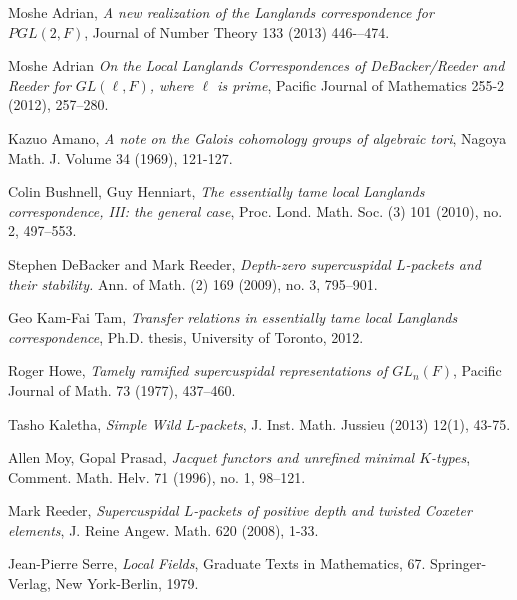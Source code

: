 \documentclass[11pt]{amsart}
\theoremstyle{plain}
\theoremstyle{definition}
\begin{document}
\begin{thebibliography}{9}

  Moshe Adrian,
  \emph{A new realization of the Langlands correspondence for $PGL(2,F)$}, Journal of Number Theory 133 (2013) 446-–474.

  Moshe Adrian
  \emph{On the Local Langlands Correspondences of DeBacker/Reeder and Reeder for $GL(\ell,F)$, where $\ell$ is prime}, Pacific Journal of Mathematics 255-2 (2012), 257--280.

  Kazuo Amano,
  \emph{A note on the Galois cohomology groups of algebraic tori}, Nagoya Math. J. Volume 34 (1969), 121-127.

  Colin Bushnell, Guy Henniart,
  \emph{The essentially tame local Langlands correspondence, III: the general case}, Proc. Lond. Math. Soc. (3) 101 (2010), no. 2, 497–553.

  Stephen DeBacker and Mark Reeder,
  \emph{Depth-zero supercuspidal $L$-packets and their stability.}
  Ann. of Math. (2) 169 (2009), no. 3, 795--901.

  Geo Kam-Fai Tam,
  \emph{Transfer relations in essentially tame local Langlands correspondence}, Ph.D. thesis, University of Toronto, 2012.

  Roger Howe,
  \emph{Tamely ramified supercuspidal representations of $GL_n(F)$},
   Pacific Journal of Math.  73  (1977),  437--460.

  Tasho Kaletha, \emph{Simple Wild L-packets}, J. Inst. Math. Jussieu (2013) 12(1), 43-75.

  Allen Moy, Gopal Prasad,
  \emph{Jacquet functors and unrefined minimal $K$-types},
   Comment. Math. Helv. 71 (1996), no. 1, 98--121.

  Mark Reeder,
  \emph{Supercuspidal $L$-packets of positive depth and twisted Coxeter elements},
  J. Reine Angew. Math. 620 (2008), 1-33.

  Jean-Pierre Serre,
  \emph{Local Fields}, Graduate Texts in Mathematics, 67. Springer-Verlag, New York-Berlin, 1979.

\end{thebibliography}
\end{document}
